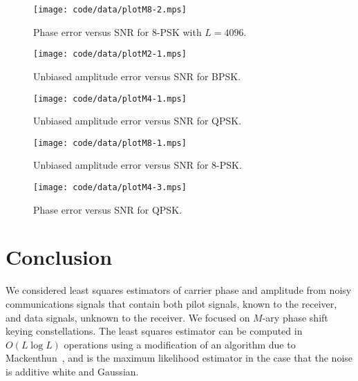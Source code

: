 \documentclass[journal]{IEEEtran}
\begin{document}
\begin{figure}[p]
	\centering
		\texttt{[image: code/data/plotM8-2.mps]}
		\caption{Phase error versus SNR for $8$-PSK with $L=4096$.}
		\label{fig:plotphase8PSK}
\end{figure}



\begin{figure}[p]
	\centering
		\texttt{[image: code/data/plotM2-1.mps]}
		\caption{Unbiased amplitude error versus SNR for BPSK.}
		\label{fig:plotampBPSK}
\end{figure}

\begin{figure}[p]
	\centering
		\texttt{[image: code/data/plotM4-1.mps]}
		\caption{Unbiased amplitude error versus SNR for QPSK.}
		\label{fig:plotampQPSK}
\end{figure}

\begin{figure}[p]
	\centering
		\texttt{[image: code/data/plotM8-1.mps]}
		\caption{Unbiased amplitude error versus SNR for $8$-PSK.}
		\label{fig:plotamp8PSK}
\end{figure}


\begin{figure}[tp]
	\centering
		\texttt{[image: code/data/plotM4-3.mps]}
		\caption{Phase error versus SNR for QPSK.}
		\label{fig:plotphaseQPSKmultL}
\end{figure}


\section{Conclusion}

We considered least squares estimators of carrier phase and amplitude from noisy communications signals that contain both pilot signals, known to the receiver, and data signals, unknown to the receiver.  We focused on $M$-ary phase shift keying constellations.  The least squares estimator can be computed in $O(L\log L)$ operations using a modification of an algorithm due to Mackenthun~\cite{Mackenthun1994}, and is the maximum likelihood estimator in the case that the noise is additive white and Gaussian.  
\end{document}
